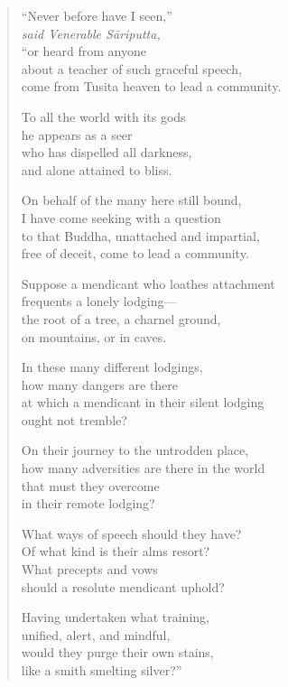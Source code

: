 \documentclass[12pt,openany]{book}%
\newcommand*{\scspeaker}[1]{\hspace{2em}\textit{#1}}
\begin{document}
\begin{verse}%
“Never before have I seen,” \\
\scspeaker{said Venerable \textsanskrit{Sāriputta}, }\\
“or heard from anyone \\
about a teacher of such graceful speech, \\
come from Tusita heaven to lead a community. 

To all the world with its gods \\
he appears as a seer \\
who has dispelled all darkness, \\
and alone attained to bliss. 

On behalf of the many here still bound, \\
I have come seeking with a question \\
to that Buddha, unattached and impartial, \\
free of deceit, come to lead a community. 

Suppose a mendicant who loathes attachment \\
frequents a lonely lodging—\\
the root of a tree, a charnel ground, \\
on mountains, or in caves. 

In these many different lodgings, \\
how many dangers are there \\
at which a mendicant in their silent lodging \\
ought not tremble? 

On their journey to the untrodden place, \\
how many adversities are there in the world \\
that must they overcome \\
in their remote lodging? 

What ways of speech should they have? \\
Of what kind is their alms resort? \\
What precepts and vows \\
should a resolute mendicant uphold? 

Having undertaken what training, \\
unified, alert, and mindful, \\
would they purge their own stains, \\
like a smith smelting silver?” 


\end{verse}
\end{document}
